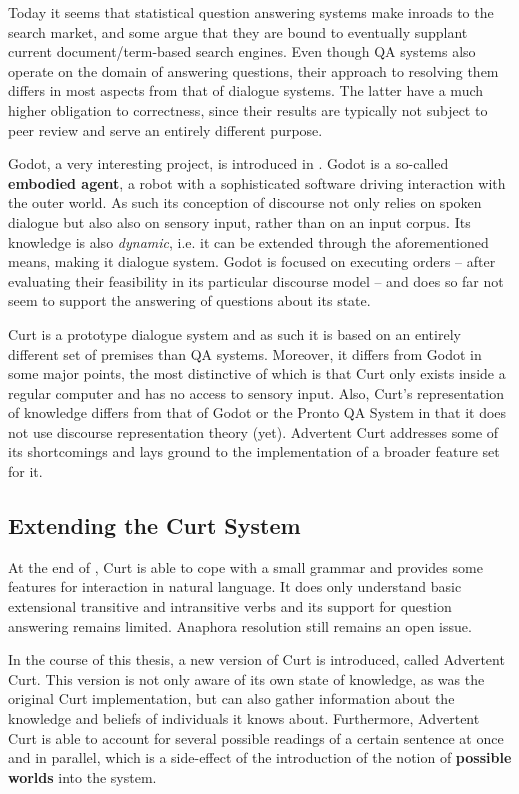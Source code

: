 \documentclass[a4paper]{article}
\newcommand{\abbr}{\textsf} %
\newcommand{\term}[1]{\textsf{\textbf{#1}}} %
\newcommand{\pn}{\textsf} %
\newcommand{\curt}{\pn{Curt}}
\newcommand{\acurt}{\pn{Advertent Curt}}
\theoremstyle{remark}
\theoremstyle{remark}
\theoremstyle{definition}
\theoremstyle{definition}
\begin{document}
Today it seems that statistical question answering systems make inroads to the search market,
and some argue that they are bound to eventually supplant current document/term-based
search engines. Even though \abbr{QA} systems also operate on the domain of
answering questions, their approach to resolving them differs in most aspects
from that of dialogue systems. The latter have a much higher obligation to
correctness, since their results are typically not subject to peer
review and serve an entirely different purpose.

\pn{Godot}, a very interesting project, is introduced in \cite{godot}.
\pn{Godot} is a so-called \term{embodied agent}, a robot with a sophisticated
software driving interaction with the outer world. As such its conception of
discourse not only relies on spoken dialogue but also also on sensory input, rather
than on an input corpus. Its knowledge is also \emph{dynamic}, i.e. it can be
extended through the aforementioned means, making it
dialogue system.
\pn{Godot} is focused on executing orders -- after evaluating their feasibility
in its particular discourse model -- and does so far not seem to support the answering
of questions about its state.

\curt{} is a prototype dialogue system and as such it is based on an entirely different set of
premises than \abbr{QA} systems. Moreover, it differs from \pn{Godot} in some
major points, the most distinctive of which is that \curt{} only exists inside a
regular computer and has no access to sensory input. Also, \curt's
representation of knowledge differs from that of \pn{Godot} or the \pn{Pronto QA
System} in that it does not use discourse representation theory (yet). \acurt{}
addresses some of its shortcomings and lays ground to the implementation of a
broader feature set for it.

\subsection{Extending the Curt System}\label{sec:extension}

At the end of \cite{blackburnbos:cl1}, \curt{} is able to cope with a small
grammar and provides some features for interaction in natural
language. It does only understand basic extensional transitive and intransitive
verbs and its support for question answering remains limited.
Anaphora resolution still remains an open issue.

In the course of this thesis, a new version of \curt{} is introduced, called
\acurt. This version is not only aware of its own state of knowledge, as was the
original \curt{} implementation, but can also gather information about the
knowledge and beliefs of individuals it knows about. Furthermore, \acurt{} is
able to account for several possible readings of a certain sentence at once and
in parallel, which is a side-effect of the introduction of the notion of
\term{possible worlds} into the system.
\end{document}
